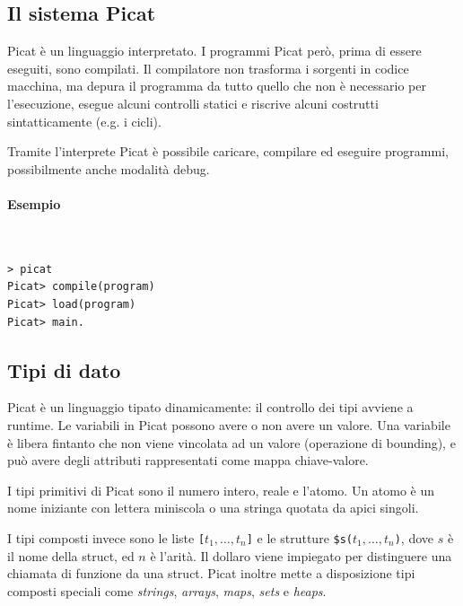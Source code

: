 \documentclass[12pt,a4paper,openright]{book} %
\begin{document}
\subsection{Il sistema Picat}
\label{sec:picat_base_system}

Picat è un linguaggio interpretato. I programmi Picat però, prima di essere eseguiti, sono compilati. Il compilatore non trasforma i sorgenti in codice macchina, ma depura il programma da tutto quello che non è necessario per l'esecuzione, esegue alcuni controlli statici e riscrive alcuni costrutti sintatticamente (e.g. i cicli).

Tramite l'interprete Picat è possibile caricare, compilare ed eseguire programmi, possibilmente anche modalità debug.

\paragraph{Esempio}\
\begin{verbatim}
> picat
Picat> compile(program)
Picat> load(program)
Picat> main.
\end{verbatim}

\subsection{Tipi di dato}
\label{sec:picat_base_datatype}

Picat è un linguaggio tipato dinamicamente: il controllo dei tipi avviene a runtime. Le variabili in Picat possono avere o non avere un valore. Una variabile è libera fintanto che non viene vincolata ad un valore (operazione di bounding), e può avere degli attributi rappresentati come mappa chiave-valore.

I tipi primitivi di Picat sono il numero intero, reale e l'atomo. Un atomo è un nome iniziante con lettera miniscola o una stringa quotata da apici singoli.

I tipi composti invece sono le liste \verb|[|$t_1, \ldots, t_n$\verb|]| e le strutture \verb|$s(|$t_1, \ldots, t_n$\verb|)|, dove $s$ è il nome della struct, ed $n$ è l'arità. Il dollaro viene impiegato per distinguere una chiamata di funzione da una struct. Picat inoltre mette a disposizione tipi composti speciali come \emph{strings}, \emph{arrays}, \emph{maps}, \emph{sets} e \emph{heaps}.
\end{document}
